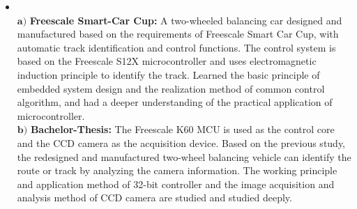 \documentclass{resume}
\begin{document}
\begin{itemize}

	\item {}%
	\\
	$\mathbf{a)}$ \textbf{Freescale Smart-Car Cup: }A two-wheeled balancing car designed and manufactured based on the requirements of Freescale Smart Car Cup, with automatic track identification and control functions. The control system is based on the Freescale S12X microcontroller and uses electromagnetic induction principle to identify the track. Learned the basic principle of embedded system design and the realization method of common control algorithm, and had a deeper understanding of the practical application of microcontroller.\\
	$\mathbf{b)}$ \textbf{Bachelor-Thesis: }The Freescale K60 MCU is used as the control core and the CCD camera as the acquisition device. Based on the previous study, the redesigned and manufactured two-wheel balancing vehicle can identify the route or track by analyzing the camera information. The working principle and application method of 32-bit controller and the image acquisition and analysis method of CCD camera are studied and studied deeply.
	

\end{itemize}
\end{document}
